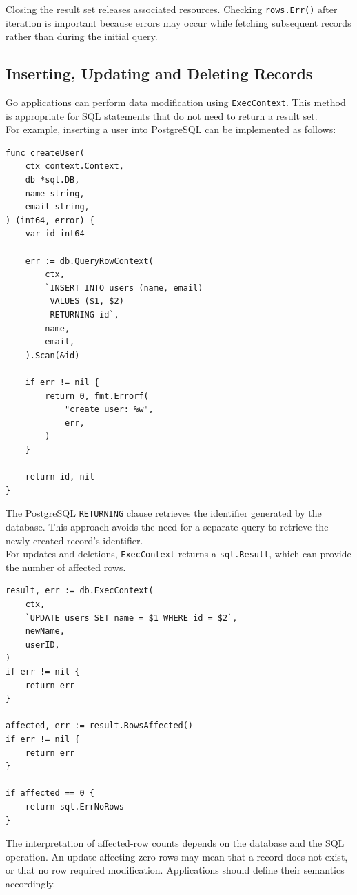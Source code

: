 Closing the result set releases associated resources. Checking \texttt{rows.Err()} after iteration is important because errors may occur while fetching subsequent records rather than during the initial query.

\subsection{Inserting, Updating and Deleting Records}

Go applications can perform data modification using \texttt{ExecContext}. This method is appropriate for SQL statements that do not need to return a result set.\\

For example, inserting a user into PostgreSQL can be implemented as follows:

\begin{lstlisting}
func createUser(
    ctx context.Context,
    db *sql.DB,
    name string,
    email string,
) (int64, error) {
    var id int64

    err := db.QueryRowContext(
        ctx,
        `INSERT INTO users (name, email)
         VALUES ($1, $2)
         RETURNING id`,
        name,
        email,
    ).Scan(&id)

    if err != nil {
        return 0, fmt.Errorf(
            "create user: %w",
            err,
        )
    }

    return id, nil
}
\end{lstlisting}

The PostgreSQL \texttt{RETURNING} clause retrieves the identifier generated by the database. This approach avoids the need for a separate query to retrieve the newly created record's identifier.\\

For updates and deletions, \texttt{ExecContext} returns a \texttt{sql.Result}, which can provide the number of affected rows.

\begin{lstlisting}
result, err := db.ExecContext(
    ctx,
    `UPDATE users SET name = $1 WHERE id = $2`,
    newName,
    userID,
)
if err != nil {
    return err
}

affected, err := result.RowsAffected()
if err != nil {
    return err
}

if affected == 0 {
    return sql.ErrNoRows
}
\end{lstlisting}

The interpretation of affected-row counts depends on the database and the SQL operation. An update affecting zero rows may mean that a record does not exist, or that no row required modification. Applications should define their semantics accordingly.

